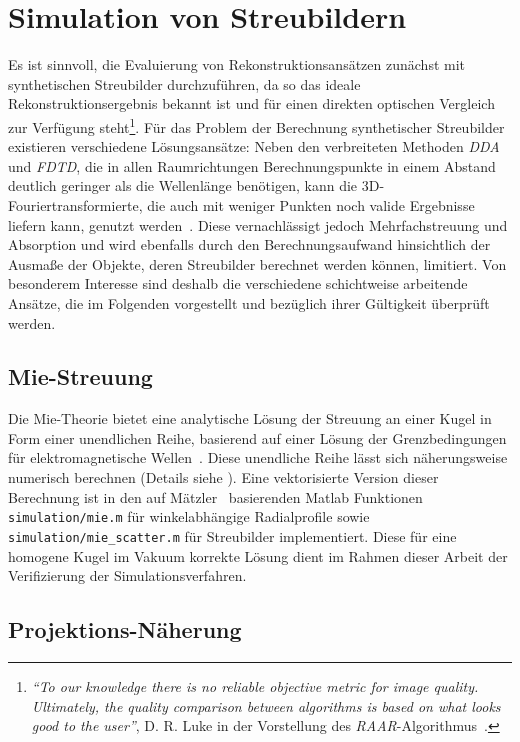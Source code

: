 \chapter{Simulation von Streubildern}
Es ist sinnvoll, die Evaluierung von Rekonstruktionsansätzen zunächst mit synthetischen Streubilder durchzuführen, da so das ideale Rekonstruktionsergebnis bekannt ist und für einen direkten optischen Vergleich zur Verfügung steht\footnote{\textit{"`To our
	knowledge there is no reliable objective metric for image quality. Ultimately, the quality
	comparison between algorithms is based on what looks good to the user"'}, D. R. Luke in der Vorstellung des \textit{RAAR}-Algorithmus~\cite{luke2004}.}. 
Für das Problem der Berechnung synthetischer Streubilder existieren verschiedene Lösungsansätze: Neben den verbreiteten Methoden \textit{DDA} und \textit{FDTD}, die in allen Raumrichtungen Berechnungspunkte in einem Abstand deutlich geringer als die Wellenlänge benötigen, kann die 3D-Fouriertransformierte, die auch mit weniger Punkten noch valide Ergebnisse liefern kann, genutzt werden~\cite{kunz1993,sander2014,hantke2016}. Diese vernachlässigt jedoch Mehrfachstreuung und Absorption und wird ebenfalls durch den Berechnungsaufwand hinsichtlich der Ausmaße der Objekte, deren Streubilder berechnet werden können, limitiert. Von besonderem Interesse sind deshalb die verschiedene schichtweise arbeitende Ansätze, die im Folgenden vorgestellt und bezüglich ihrer Gültigkeit überprüft werden.

\section{Mie-Streuung}
Die Mie-Theorie bietet eine analytische Lösung der Streuung an einer Kugel in Form einer unendlichen Reihe, basierend auf einer Lösung der Grenzbedingungen für elektromagnetische Wellen~\cite{bohren1983}. Diese unendliche Reihe lässt sich näherungsweise numerisch berechnen (Details siehe ). Eine vektorisierte Version dieser Berechnung ist in den auf Mätzler~\cite{maetzler2002} basierenden Matlab Funktionen \texttt{simulation/mie.m} für winkelabhängige Radialprofile sowie \texttt{simulation/mie\_scatter.m} für Streubilder implementiert. Diese für eine homogene Kugel im Vakuum korrekte Lösung dient im Rahmen dieser Arbeit der Verifizierung der Simulationsverfahren.

\section{Projektions-Näherung}
	
